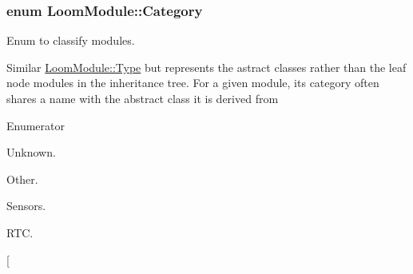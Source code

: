 \subsubsection[{\texorpdfstring{Category}{Category}}]{\setlength{\rightskip}{0pt plus 5cm}enum {\bf Loom\+Module\+::\+Category}\hspace{0.3cm}{\ttfamily [strong]}}\hypertarget{class_loom_module_a0c6ecc60315f95af551138dc83567068}{}\label{class_loom_module_a0c6ecc60315f95af551138dc83567068}


Enum to classify modules. 

Similar \hyperlink{class_loom_module_aee91d0a75140d51ee428fc2d4417d865}{Loom\+Module\+::\+Type} but represents the astract classes rather than the leaf node modules in the inheritance tree. For a given module, its category often shares a name with the abstract class it is derived from \begin{Desc}
\item[Enumerator]\par
\begin{description}
\item[{\em 
Unknown\hypertarget{class_loom_module_a0c6ecc60315f95af551138dc83567068a88183b946cc5f0e8c96b2e66e1c74a7e}{}\label{class_loom_module_a0c6ecc60315f95af551138dc83567068a88183b946cc5f0e8c96b2e66e1c74a7e}
}]Unknown. \item[{\em 
Other\hypertarget{class_loom_module_a0c6ecc60315f95af551138dc83567068a6311ae17c1ee52b36e68aaf4ad066387}{}\label{class_loom_module_a0c6ecc60315f95af551138dc83567068a6311ae17c1ee52b36e68aaf4ad066387}
}]Other. \item[{\em 
Sensor\hypertarget{class_loom_module_a0c6ecc60315f95af551138dc83567068a06b185256c71c1aec263c6e22bf8ef6b}{}\label{class_loom_module_a0c6ecc60315f95af551138dc83567068a06b185256c71c1aec263c6e22bf8ef6b}
}]Sensors. \item[{\em 
L\+\_\+\+R\+TC\hypertarget{class_loom_module_a0c6ecc60315f95af551138dc83567068afc65b1fe417628d7c6c7bd9ebfbc50c5}{}\label{class_loom_module_a0c6ecc60315f95af551138dc83567068afc65b1fe417628d7c6c7bd9ebfbc50c5}
}]R\+TC. \item[{\em 
}
\end{description}
\end{Desc}
